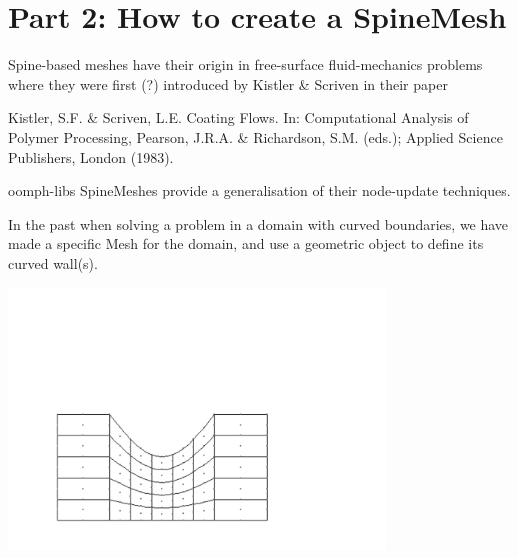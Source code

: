  

\hypertarget{index_part2}{}\section{Part 2\+: How to create a Spine\+Mesh}\label{index_part2}
Spine-\/based meshes have their origin in free-\/surface fluid-\/mechanics problems where they were first (?) introduced by Kistler \& Scriven in their paper

\begin{center} Kistler, S.\+F. \& Scriven, L.\+E. {\ttfamily Coating Flows.\textquotesingle{}\textquotesingle{} In\+: }Computational Analysis of Polymer Processing,\textquotesingle{}\textquotesingle{} Pearson, J.\+R.\+A. \& Richardson, S.\+M. (eds.); Applied Science Publishers, London (1983). \end{center} 

{\ttfamily oomph-\/lib\textquotesingle{}s} Spine\+Meshes provide a generalisation of their node-\/update techniques.

In the past when solving a problem in a domain with curved boundaries, we have made a specific Mesh for the domain, and use a geometric object to define its curved wall(s).

 
\begin{DoxyImage}
\includegraphics[width=0.75\textwidth]{mesh}
\end{DoxyImage}


